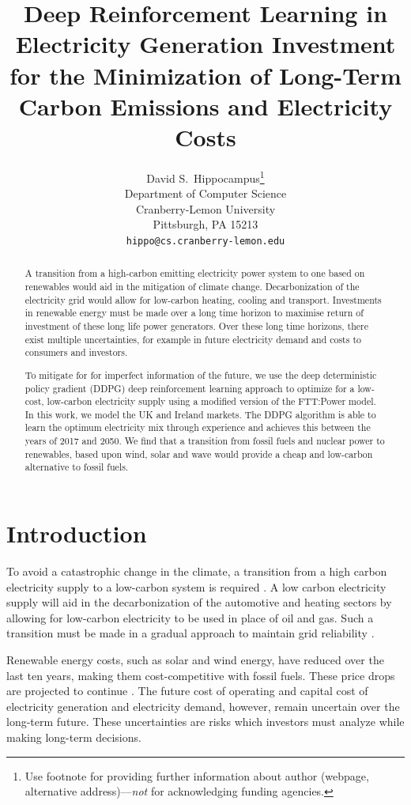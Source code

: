 \documentclass{article}
\title{Deep Reinforcement Learning in Electricity Generation Investment for the Minimization of Long-Term Carbon Emissions and Electricity Costs}
\author{%
  David S.~Hippocampus\thanks{Use footnote for providing further information
    about author (webpage, alternative address)---\emph{not} for acknowledging
    funding agencies.} \\
  Department of Computer Science\\
  Cranberry-Lemon University\\
  Pittsburgh, PA 15213 \\
  \texttt{hippo@cs.cranberry-lemon.edu} \\
}
\begin{document}
\maketitle

\begin{abstract}

A transition from a high-carbon emitting electricity power system to one based on renewables would aid in the mitigation of climate change. Decarbonization of the electricity grid would allow for low-carbon heating, cooling and transport. Investments in renewable energy must be made over a long time horizon to maximise return of investment of these long life power generators. Over these long time horizons, there exist multiple uncertainties, for example in future electricity demand and costs to consumers and investors. 

To mitigate for for imperfect information of the future, we use the deep deterministic policy gradient (DDPG) deep reinforcement learning approach to optimize for a low-cost, low-carbon electricity supply using a modified version of the FTT:Power model. In this work, we model the UK and Ireland markets. The DDPG algorithm is able to learn the optimum electricity mix through experience and achieves this between the years of 2017 and 2050. We find that a transition from fossil fuels and nuclear power to renewables, based upon wind, solar and wave would provide a cheap and low-carbon alternative to fossil fuels.

\end{abstract}




\section{Introduction}
\label{sec:intro}


To avoid a catastrophic change in the climate, a transition from a high carbon electricity supply to a low-carbon system is required \cite{Kell2020}. A low carbon electricity supply will aid in the decarbonization of the automotive and heating sectors by allowing for low-carbon electricity to be used in place of oil and gas. Such a transition must be made in a gradual approach to maintain grid reliability \cite{Kahrl2011}.

Renewable energy costs, such as solar and wind energy, have reduced over the last ten years, making them cost-competitive with fossil fuels. These price drops are projected to continue \cite{IEA2015}. The future cost of operating and capital cost of electricity generation and electricity demand, however, remain uncertain over the long-term future. These uncertainties are risks which investors must analyze while making long-term decisions.
\end{document}

